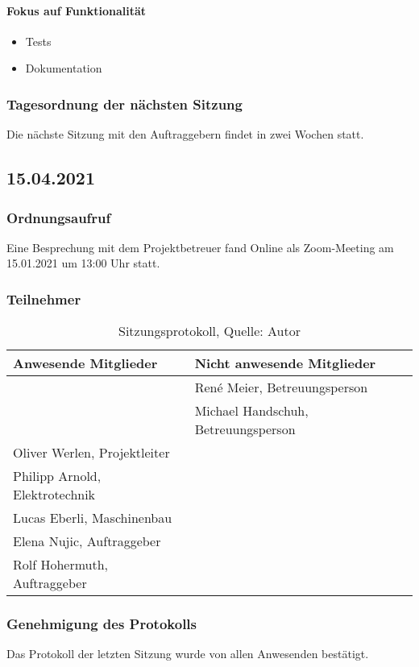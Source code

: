 \paragraph{Fokus auf Funktionalität}
\begin{itemize}
	\item Tests
	\item Dokumentation
\end{itemize}
\subsubsection{Tagesordnung der nächsten Sitzung}
Die nächste Sitzung mit den Auftraggebern findet in zwei Wochen statt. 
\newpage
\subsection{15.04.2021}
\subsubsection{Ordnungsaufruf}
Eine Besprechung mit dem Projektbetreuer fand Online als Zoom-Meeting am 15.01.2021 um 13:00 Uhr statt.
\subsubsection{Teilnehmer}
\begin{table}[H]
	\setlength\extrarowheight{2pt} %
	\begin{tabularx}{\textwidth}{|X|X|}
		\hline
		\textbf{Anwesende Mitglieder} &  \textbf{Nicht anwesende Mitglieder} \\
		\hline
		&  René Meier, Betreuungsperson   \\
		&  Michael Handschuh, Betreuungsperson   \\
		Oliver Werlen, Projektleiter &  \\
		Philipp Arnold, Elektrotechnik  &\\
		Lucas Eberli, Maschinenbau & \\
		Elena Nujic, Auftraggeber &  \\
		Rolf Hohermuth, Auftraggeber &  \\
		\hline
	\end{tabularx}
	\caption{ \label{tbl: Teilnehmerliste vom 15.04.2021_2}Sitzungsprotokoll, Quelle: Autor}
\end{table}
\subsubsection{Genehmigung des Protokolls}
Das Protokoll der letzten Sitzung wurde von allen Anwesenden bestätigt.
